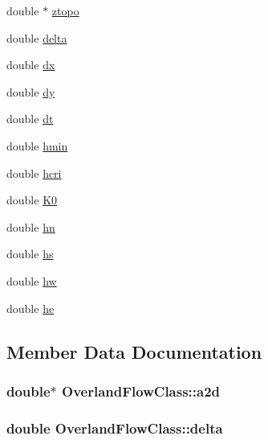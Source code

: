 \begin{DoxyCompactItemize}
\item 
double $\ast$ \hyperlink{class_overland_flow_class_a63cfc55b7070b2f76989c6c2b7b5f9f5}{ztopo}
\item 
double \hyperlink{class_overland_flow_class_aa7cccb78552fd0141a7412417c13c80d}{delta}
\item 
double \hyperlink{class_overland_flow_class_a739ec0f9a5d79f8dbe06af906b21aa44}{dx}
\item 
double \hyperlink{class_overland_flow_class_acd373aac26cf40f24653b640e7a2001d}{dy}
\item 
double \hyperlink{class_overland_flow_class_a304a2ed22f866dcada1822a63ce1e864}{dt}
\item 
double \hyperlink{class_overland_flow_class_aec2962ffce1945e21a1e4881092a514f}{hmin}
\item 
double \hyperlink{class_overland_flow_class_a1095b59df3d9cbc15316b73f0260f62a}{hcri}
\item 
double \hyperlink{class_overland_flow_class_ab3e170dcf79cee5d98083b9581f262aa}{K0}
\item 
double \hyperlink{class_overland_flow_class_a2e321eefa3f2b13af8e14169e76ec5cb}{hn}
\item 
double \hyperlink{class_overland_flow_class_a08572ebe8ddb3ae5af0d8d6fe955f1a0}{hs}
\item 
double \hyperlink{class_overland_flow_class_ab714c67fa0b8eec05d45034447acbf41}{hw}
\item 
double \hyperlink{class_overland_flow_class_ab40501241e701915e27bec6967157b02}{he}
\end{DoxyCompactItemize}


\subsection{Member Data Documentation}
\subsubsection[{\texorpdfstring{a2d}{a2d}}]{\setlength{\rightskip}{0pt plus 5cm}double$\ast$ Overland\+Flow\+Class\+::a2d}\hypertarget{class_overland_flow_class_ae9d7af57fca60e593a9ade48f8391af9}{}\label{class_overland_flow_class_ae9d7af57fca60e593a9ade48f8391af9}
\subsubsection[{\texorpdfstring{delta}{delta}}]{\setlength{\rightskip}{0pt plus 5cm}double Overland\+Flow\+Class\+::delta}\hypertarget{class_overland_flow_class_aa7cccb78552fd0141a7412417c13c80d}{}\label{class_overland_flow_class_aa7cccb78552fd0141a7412417c13c80d}
